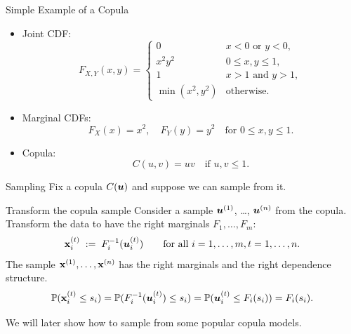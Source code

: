 \documentclass[11pt,handout,aspectratio=169]{beamer}
\begin{document}
\begin{frame}{Simple Example of a Copula}
\begin{itemize}
    \item Joint CDF:
    \[ F_{X,Y}(x, y) =
    \begin{cases} 
    0 & x < 0 \text{ or } y < 0, \\
    x^2 y^2 & 0 \leq x, y \leq 1, \\
    1 & x > 1 \text{ and } y > 1, \\
    \min(x^2, y^2) & \text{otherwise}.
    \end{cases} \]
    \item Marginal CDFs:
    \[ F_X(x) = x^2, \quad F_Y(y) = y^2 \quad \text{for } 0 \leq x, y \leq 1. \]
    \item Copula:
    \[ C(u, v) = uv \quad \text{if } u, v \leq 1. \]
\end{itemize}
\end{frame}


\begin{frame}{Sampling}
	Fix a copula $C(\boldsymbol u)$ and suppose we can sample from it.
	\begin{block}{Transform the copula sample}
		Consider a sample $\boldsymbol u^{(1)}$, \ldots, $\boldsymbol u^{(n)}$ from the copula.\\[3mm]
		
		Transform the data to have the right marginals $F_1,\ldots,F_m$:
		$$
		\mathbf{x}^{(t)}_i \;:=\; F_i^{-1}(\boldsymbol u^{(t)}_i)\qquad\mbox{for all }i=1,\ldots,m, t=1,\ldots,n.
		$$
		The sample $\mathbf{x}^{(1)},\ldots,\mathbf{x}^{(n)}$ has the right marginals and the right dependence structure. 
		$$
		\mathbb P(\mathbf{x}_i^{(t)}\leq s_i)=\mathbb P(F_i^{-1}(\boldsymbol u_i^{(t)})\leq s_i)=\mathbb P(\boldsymbol u_i^{(t)}\leq F_i(s_i))=F_i(s_i).
		$$
	\end{block}
	\medskip
	We will later show how to sample from some popular copula models. 
\end{frame}
\end{document}
